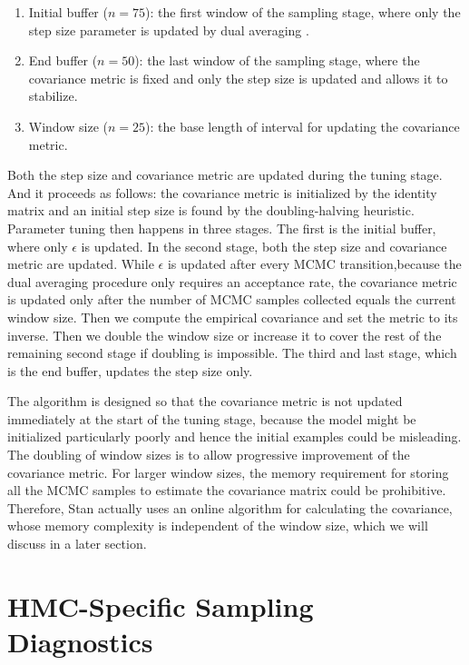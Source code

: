 \documentclass[12pt]{report}
\begin{document}
\begin{enumerate}
\item Initial buffer ($n=75$): the first window of the sampling stage, where only the step size parameter is updated by dual averaging .

\item End buffer ($n=50$): the last window of the sampling stage, where the covariance metric is fixed and only the step size is updated and allows it to stabilize.

\item Window size ($n=25$): the base length of interval for updating the covariance metric. 
\end{enumerate}

Both the step size and covariance metric are updated during the tuning stage. And it proceeds as follows: the covariance metric is initialized by the identity matrix and an initial step size is found by the doubling-halving heuristic. Parameter tuning then happens in three stages. The first is the initial buffer, where only $\epsilon $ is updated. In the second stage, both the step size and covariance metric are updated. While $\epsilon$ is updated after every MCMC transition,because the dual averaging procedure only requires an acceptance rate, the covariance metric is updated only after the number of MCMC samples collected equals the current window size. Then we compute the empirical covariance and set the metric to its inverse. Then we double the window size or increase it to cover the rest of the remaining second stage if doubling is impossible. The third and last stage, which is the end buffer, updates the step size only. 

The algorithm is designed so that the covariance metric is not updated immediately at the start of the tuning stage, because the model might be initialized particularly poorly and hence the initial examples could be misleading. The doubling of window sizes is to allow progressive improvement of the covariance metric. For larger window sizes, the memory requirement for storing all the MCMC samples to estimate the covariance matrix could be prohibitive. Therefore, Stan actually uses an online algorithm for calculating the covariance, whose memory complexity is independent of the window size, which we will discuss in a later section.

\section{HMC-Specific Sampling Diagnostics}
\end{document}
